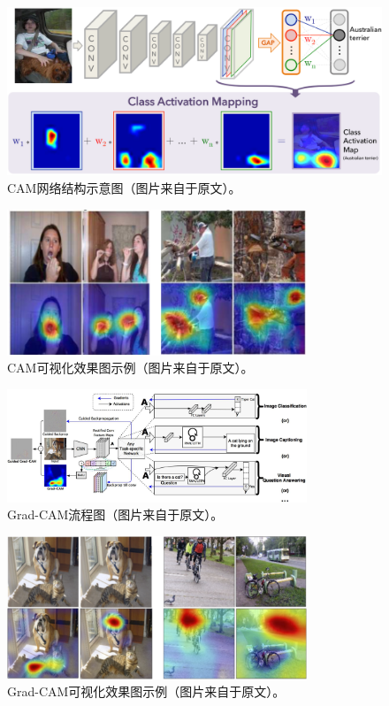 \begin{figure}[h]
	\centering
	\includegraphics[width=1.0\textwidth]{figure/cam_arichitecture}
	\caption{CAM网络结构示意图（图片来自于原文）。}
	\label{fig:cam_arichitecture}
\end{figure}
\begin{figure}[h]
	\centering
	\includegraphics[width=0.8\textwidth]{figure/cam_example}
	\caption{CAM可视化效果图示例（图片来自于原文）。}
	\label{fig:cam_example}
\end{figure}
\begin{figure}[h]
	\centering
	\includegraphics[width=0.8\textwidth]{figure/grad_cam_architecture}
	\caption{Grad-CAM流程图（图片来自于原文）。}
	\label{fig:grad_cam_architecture}
\end{figure}
\begin{figure}[h]
	\centering
	\includegraphics[width=0.8\textwidth]{figure/grad_cam_example}
	\caption{Grad-CAM可视化效果图示例（图片来自于原文）。} 
	\label{fig:grad_cam_example}
\end{figure}
